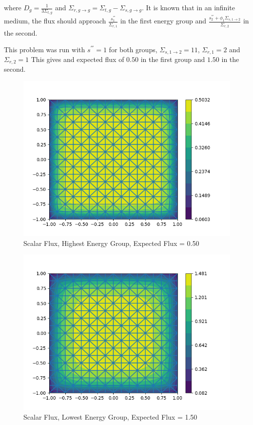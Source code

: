 where $D_g = \frac{1}{3\Sigma_{t, g}}$ and $\Sigma_{r, g \rightarrow g} = \Sigma_{t, g} - \Sigma_{s, g \rightarrow g}$. It is known that in an infinite medium, the flux should approach $\frac{s_1^{'''}}{\Sigma_{r, 1}}$ in the first energy group and $\frac{s_2^{'''} + \phi_1 \Sigma_{s, 1 \rightarrow 2}}{\Sigma_{r, 2}}$ in the second.  

This problem was run with $ s^{'''} = 1$ for both groups, $\Sigma_{s, 1\rightarrow 2} = 11$, $\Sigma_{r, 1} = 2$ and $\Sigma_{r, 2} = 1$ This gives and expected flux of $0.50 $ in the first group and $1.50$ in the second. 

\begin{figure}
    \centering
    \includegraphics[width=\textwidth]{fig/gs_test_scalar_flux_group0.png}
    \caption{Scalar Flux, Highest Energy Group, Expected Flux = 0.50}
    \label{fig:gs_g1}
\end{figure}

\begin{figure}
    \centering
    \includegraphics[width=\textwidth]{fig/gs_test_scalar_flux_group1.png}
    \caption{Scalar Flux, Lowest Energy Group, Expected Flux = 1.50}
    \label{fig:gs_g2}
\end{figure}